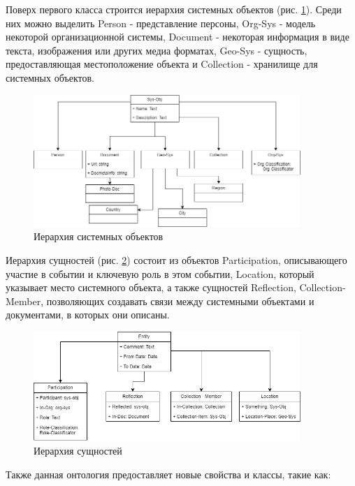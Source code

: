 \documentclass[12pt]{article}
\begin{document}
Поверх первого класса строится иерархия системных объектов (рис. \ref{fig:sys_obj_hier}). Среди них можно выделить Person - представление персоны, Org-Sys - модель некоторой организационной системы, Document - некоторая информация в виде текста, изображения или других медиа форматах, Geo-Sys - сущность, предоставляющая местоположение объекта и Collection - хранилище для системных объектов.

\begin{figure}[!ht]
    \centering
    \includegraphics[width=0.9\textwidth]{_images/sys_obj_all.png}
    \caption{Иерархия системных объектов}
    \label{fig:sys_obj_hier}
\end{figure}

\pagebreak

Иерархия сущностей (рис. \ref{fig:ent_obj_hier}) состоит из объектов Participation, описывающего участие в событии и ключевую роль в этом событии, Location, который указывает место системного объекта, а также сущностей Reflection, Collection-Member, позволяющих создавать связи между системными объектами и документами, в которых они описаны.

\begin{figure}[!ht]
    \centering
    \includegraphics[width=0.9\textwidth]{_images/ent_all.png}
    \caption{Иерархия сущностей}
    \label{fig:ent_obj_hier}
\end{figure}

Также данная онтология предоставляет новые свойства и классы, такие как:
\end{document}

